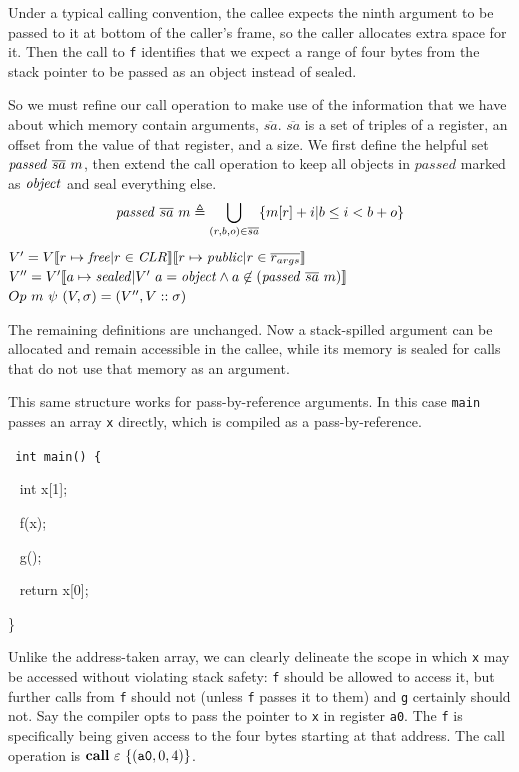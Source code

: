 \documentclass[10pt,conference]{ieeetran}%
\theoremstyle{definition}
\begin{document}
Under a typical calling convention, the callee expects the ninth argument to
be passed to it at bottom of the caller's frame, so the caller allocates extra
space for it. Then the call to {\tt f} identifies that we expect a range of four
bytes from the stack pointer to be passed as an object instead of sealed.

So we must refine our call operation to make use of the information that we have about
which memory contain arguments, \(\overline{sa}\). \(\overline{sa}\) is a set of
triples of a register, an offset from the value of that register, and a size.
We first define the helpful set \(\mathit{passed} ~ \overline{sa} ~ m\),
then extend the call operation to keep all objects in \(\mathit{passed}\) marked
as \(\mathit{object}\) and seal everything else.
%
\[\mathit{passed} ~ \overline{sa} ~ m \triangleq
\bigcup_{(r,b,o) \in \overline{sa}} \{m[r]+i | b \leq i < b+o\}\]
%
             {\(V' = V \llbracket r \mapsto \mathit{free} | r \in \mathit{CLR} \rrbracket
               \llbracket r \mapsto \mathit{public} | r \in \overline{r_{args}} \rrbracket\)}
             {\(V'' = V'\llbracket a \mapsto \mathit{sealed} | V' ~ a = \mathit{object} \land a \not \in (\mathit{passed} ~ \overline{sa} ~ m) \rrbracket\)}
             {\(Op ~ m ~ \psi ~ (V,\sigma) =
               (V'',V::\sigma)\)}

The remaining definitions are unchanged. Now a stack-spilled argument can be allocated
and remain accessible in the callee, while its memory is sealed for calls that do not
use that memory as an argument.

This same structure works for pass-by-reference arguments. In this case {\tt main}
passes an array {\tt x} directly, which is compiled as a pass-by-reference.

{\tt
  int main() \{
  
  ~ int x[1];

  ~ f(x);

  ~ g();

  ~ return x[0];

  \}
}

Unlike the address-taken array, we can clearly delineate the scope in which {\tt x} may be
accessed without violating stack safety: {\tt f} should be allowed to access it, but further
calls from {\tt f} should not (unless {\tt f} passes it to them) and {\tt g} certainly
should not. Say the compiler opts to pass the pointer to {\tt x} in register {\tt a0}.
The {\tt f} is specifically being given access to the four bytes starting at that address.
The call operation is \(\mathbf{call} ~ \varepsilon ~ \{(\mathtt{a0},0,4)\}\).
\end{document}
